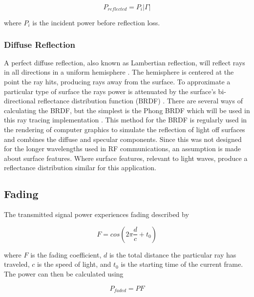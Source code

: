 \begin{equation}
	P_{reflected} = P_i|\Gamma|
	\label{eqn:reflected_power}
\end{equation}

where $P_i$ is the incident power before reflection loss.

\subsubsection{Diffuse Reflection}
A perfect diffuse reflection, also known as Lambertian reflection, will reflect rays in all directions in a uniform hemisphere \cite{Sizun2005}. The hemisphere is centered at the point the ray hits, producing rays away from the surface. To approximate a particular type of surface the rays power is attenuated by the surface's bi-directional reflectance distribution function (BRDF) \cite{Suffern2007, Pharr2010, Glassner1995}. There are several ways of calculating the BRDF, but the simplest is the Phong BRDF which will be used in this ray tracing implementation \cite{Phong:1998:ICG:280811.280980}. This method for the BRDF is regularly used in the rendering of computer graphics to simulate the reflection of light off surfaces and combines the diffuse and specular components. Since this was not designed for the longer wavelengths used in RF communications, an assumption is made about surface features. Where surface features, relevant to light waves,  produce a reflectance distribution similar for this application. 


\subsection{Fading}
The transmitted signal power experiences fading described by

\begin{equation}
	F = cos\left(2\pi \frac{d}{c} + t_0\right)
	\label{eqn:fading_coeff}
\end{equation}

where $F$ is the fading coefficient, $d$ is the total distance the particular ray has traveled, $c$ is the speed of light, and $t_0$ is the starting time of the current frame. The power can then be calculated using

\begin{equation}
	P_{faded} = PF
	\label{eqn:power_faded}
\end{equation}

